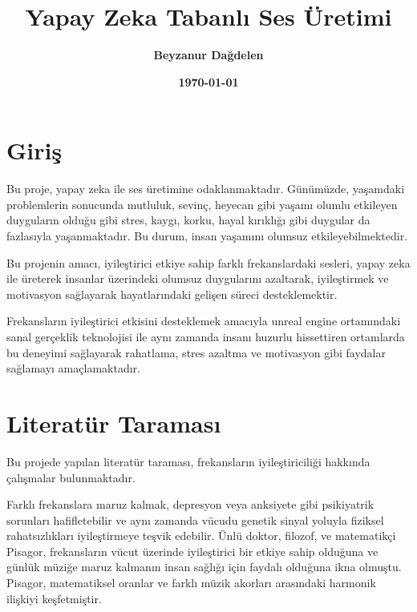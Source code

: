 \documentclass[12pt, a4paper]{article}
\title{\textbf{Yapay Zeka Tabanlı Ses Üretimi}\large }
\author{\textbf{Beyzanur Dağdelen}\large}
\date{\textbf{\today}}
\begin{document}
	
	\maketitle
	
	\thispagestyle{empty}
	
	\newpage
	\tableofcontents  %
	\newpage

	\section{Giriş} 	\vspace*{1\baselineskip}
	Bu proje, yapay zeka ile ses üretimine odaklanmaktadır. Günümüzde, yaşamdaki problemlerin sonucunda mutluluk, sevinç, heyecan gibi yaşamı olumlu etkileyen duyguların olduğu gibi stres, kaygı, korku, hayal kırıklığı gibi duygular da fazlasıyla yaşanmaktadır. Bu durum, insan yaşamını olumsuz etkileyebilmektedir. 
	 
	\raggedright Bu projenin amacı, iyileştirici etkiye sahip farklı frekanslardaki sesleri, yapay zeka ile üreterek insanlar üzerindeki olumsuz duygularını azaltarak, iyileştirmek ve motivasyon sağlayarak hayatlarındaki gelişen süreci desteklemektir.
	
	Frekansların iyileştirici etkisini desteklemek amacıyla unreal engine ortamındaki sanal gerçeklik teknolojisi ile  aynı zamanda insanı huzurlu hissettiren ortamlarda bu deneyimi sağlayarak rahatlama, stres azaltma ve motivasyon gibi faydalar sağlamayı amaçlamaktadır.
	\vspace*{3\baselineskip}
	
	\section{Literatür Taraması} 	\vspace*{1\baselineskip}
	Bu projede yapılan literatür taraması, frekansların iyileştiriciliği hakkında çalışmalar bulunmaktadır. 
	
	Farklı frekanslara maruz kalmak, depresyon veya anksiyete gibi psikiyatrik sorunları hafifletebilir ve aynı zamanda vücudu genetik sinyal yoluyla fiziksel rahatsızlıkları iyileştirmeye teşvik edebilir. Ünlü doktor, filozof, ve matematikçi Pisagor, frekansların vücut üzerinde iyileştirici bir etkiye sahip olduğuna ve günlük müziğe maruz kalmanın insan sağlığı için faydalı olduğuna ikna olmuştu. Pisagor, matematiksel oranlar ve farklı müzik akorları arasındaki harmonik ilişkiyi  keşfetmiştir\cite{myss2013anatomy}. 
	
\end{document}
